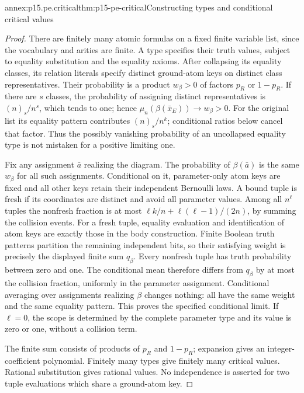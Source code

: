 \begin{annexitem}{annex:p15.pe.critical}{thm:p15-pe-critical}{Constructing types and conditional critical values}
\begin{proof}
There are finitely many atomic formulas on a fixed finite variable list,
since the vocabulary and arities are finite. A type specifies their truth
values, subject to equality substitution and the equality axioms.
After collapsing its equality classes, its relation literals specify
distinct ground-atom keys on distinct class representatives. Their
probability is a product \(w_\beta>0\) of factors \(p_R\) or \(1-p_R\).
If there are \(s\) classes, the probability of assigning distinct
representatives is \((n)_s/n^s\), which tends to one; hence
\(\mu_n(\beta(\bar x_E))\to w_\beta>0\). For the original list its
equality pattern contributes \((n)_s/n^k\); conditional ratios below
cancel that factor. Thus the possibly vanishing probability of an
uncollapsed equality type is not mistaken for a positive limiting one.

Fix any assignment \(\bar a\) realizing the diagram. The probability
of \(\beta(\bar a)\) is the same \(w_\beta\) for all such assignments.
Conditional on it, parameter-only atom keys are fixed and all other
keys retain their independent Bernoulli laws. A bound tuple is fresh
if its coordinates are distinct and avoid all parameter values.
Among all \(n^\ell\) tuples the nonfresh fraction is at most
\(\ell k/n+\ell(\ell-1)/(2n)\), by summing the collision events.
For a fresh tuple, equality evaluation and identification of atom keys
are exactly those in the body construction. Finite Boolean truth
patterns partition the remaining independent bits, so their satisfying
weight is precisely the displayed finite sum \(q_\beta\).
Every nonfresh tuple has truth probability between zero and one.
The conditional mean therefore differs from \(q_\beta\) by at most
the collision fraction, uniformly in the parameter assignment.
Conditional averaging over assignments realizing \(\beta\) changes
nothing: all have the same weight and the same equality pattern.
This proves the specified conditional limit. If \(\ell=0\), the scope
is determined by the complete parameter type and its value is zero
or one, without a collision term.

The finite sum consists of products of \(p_R\) and \(1-p_R\);
expansion gives an integer-coefficient polynomial. Finitely many
types give finitely many critical values. Rational substitution gives
rational values. No independence is asserted for two tuple evaluations
which share a ground-atom key.
\end{proof}
\end{annexitem}

